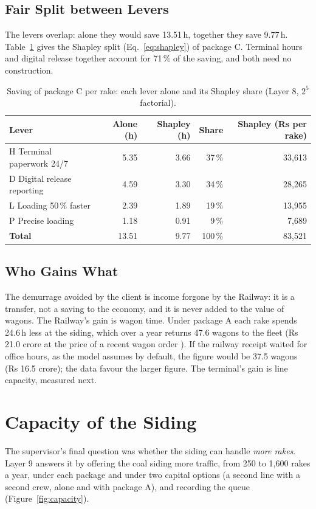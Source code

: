 \subsection{Fair Split between Levers}
The levers overlap: alone they would save 13.51\,h, together they save 9.77\,h. Table~\ref{tab:shapley} gives the Shapley split (Eq.~\eqref{eq:shapley}) of package C. Terminal hours and digital release together account for 71\,\% of the saving, and both need no construction.

\begin{table}[!htbp]
\centering
\caption[Saving of package C per rake: each lever alone and its Shapley share]{Saving of package C per rake: each lever alone and its Shapley share (Layer 8, $2^5$ factorial).}
\label{tab:shapley}
\small
\begin{tabular}{@{}lrrrr@{}}
\toprule
\textbf{Lever} & \textbf{Alone (h)} & \textbf{Shapley (h)} & \textbf{Share} & \textbf{Shapley (Rs per rake)} \\
\midrule
H Terminal paperwork 24/7 & 5.35 & 3.66 & 37\,\% & 33,613 \\
D Digital release reporting & 4.59 & 3.30 & 34\,\% & 28,265 \\
L Loading 50\,\% faster & 2.39 & 1.89 & 19\,\% & 13,955 \\
P Precise loading & 1.18 & 0.91 & 9\,\% & 7,689 \\
\midrule
\textbf{Total} & 13.51 & 9.77 & 100\,\% & 83,521 \\
\bottomrule
\end{tabular}
\end{table}

\subsection{Who Gains What}
The demurrage avoided by the client is income forgone by the Railway: it is a transfer, not a saving to the economy, and it is never added to the value of wagons. The Railway's gain is wagon time. Under package A each rake spends 24.6\,h less at the siding, which over a year returns 47.6 wagons to the fleet (Rs 21.0 crore at the price of a recent wagon order \cite{wagonvalue}). If the railway receipt waited for office hours, as the model assumes by default, the figure would be 37.5 wagons (Rs 16.5 crore); the data favour the larger figure. The terminal's gain is line capacity, measured next.

\section{Capacity of the Siding}
\label{sec:res_capacity}
The supervisor's final question was whether the siding can handle \emph{more rakes}. Layer 9 answers it by offering the coal siding more traffic, from 250 to 1,600 rakes a year, under each package and under two capital options (a second line with a second crew, alone and with package A), and recording the queue (Figure~\ref{fig:capacity}).

